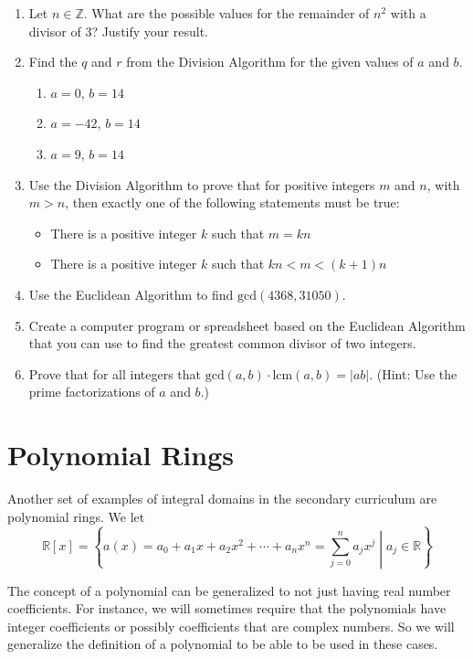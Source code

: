 \documentclass[
]{book}
\providecommand{\tightlist}{%
  \setlength{\itemsep}{0pt}\setlength{\parskip}{0pt}}
\let\stdsection\section
\renewcommand\section{\newpage\stdsection}
\theoremstyle{definition}
\theoremstyle{definition}
\theoremstyle{definition}
\theoremstyle{definition}
\theoremstyle{remark}
\begin{document}
\begin{enumerate}
\def\labelenumi{\arabic{enumi}.}
\item
  Let \(n\in \mathbb{Z}\). What are the possible values for the remainder of \(n^2\) with a divisor of \(3\)? Justify your result.
\item
  Find the \(q\) and \(r\) from the Division Algorithm for the given values of \(a\) and \(b\).

  \begin{enumerate}
  \def\labelenumii{\alph{enumii}.}
  \tightlist
  \item
    \(a=0\), \(b=14\)
  \item
    \(a=-42\), \(b=14\)
  \item
    \(a=9\), \(b=14\)
  \end{enumerate}
\item
  Use the Division Algorithm to prove that for positive integers \(m\) and \(n\), with \(m > n\), then exactly one of the following statements must be true:

  \begin{itemize}
  \tightlist
  \item
    There is a positive integer \(k\) such that \(m = kn\)
  \item
    There is a positive integer \(k\) such that \(kn < m < (k + 1)n\)
  \end{itemize}
\item
  Use the Euclidean Algorithm to find \(\mathrm{gcd}(4368,31050)\).
\item
  Create a computer program or spreadsheet based on the Euclidean Algorithm that you can use to find the greatest common divisor of two integers.
\item
  Prove that for all integers that \(\mathrm{gcd}(a,b)\cdot \mathrm{lcm}(a,b) = |ab|\). (Hint: Use the prime factorizations of \(a\) and \(b\).)
\end{enumerate}

\hypertarget{polynomial-rings}{%
\section{Polynomial Rings}\label{polynomial-rings}}

Another set of examples of integral domains in the secondary curriculum are polynomial rings. We let \[\mathbb{R}[x]= \left\{ a(x)=a_0 + a_1 x + a_2 x^2 + \cdots + a_n x^n =\sum_{j=0}^n a_j x^j  \middle \vert a_j \in \mathbb{R} \right\}\]

The concept of a polynomial can be generalized to not just having real number coefficients. For instance, we will sometimes require that the polynomials have integer coefficients or possibly coefficients that are complex numbers. So we will generalize the definition of a polynomial to be able to be used in these cases.
\end{document}
